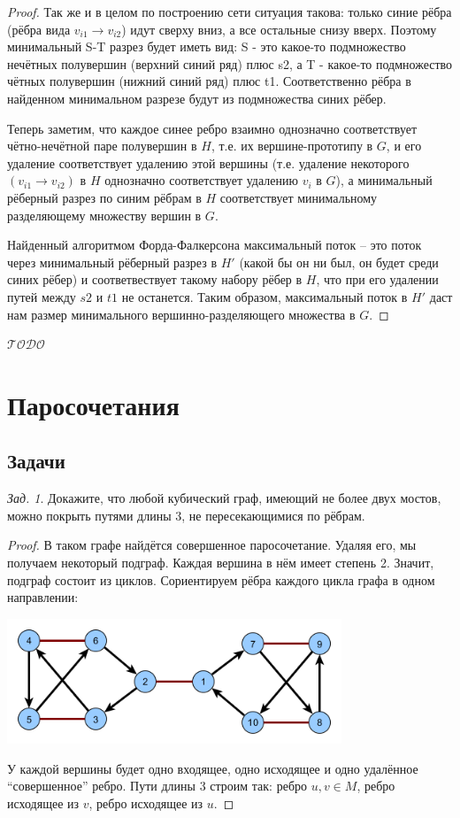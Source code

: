 \documentclass[a4paper,12pt]{article}
\numberwithin{figure}{section}
\theoremstyle{remark}
\newtheorem{problem}{Зад.}[section]
\def\iiTODO{\guillemotleft$\mathcal{TODO}$\guillemotright\textellipsis}
\begin{document}
\begin{proof}
	Так же и в целом по построению сети ситуация такова: только синие рёбра (рёбра вида $v_{i1} \rightarrow v_{i2}$) идут сверху вниз, а все остальные снизу вверх. Поэтому минимальный S-T разрез будет иметь вид: S - это какое-то подмножество нечётных полувершин (верхний синий ряд) плюс s2, а T - какое-то подмножество чётных полувершин (нижний синий ряд) плюс t1. Соответственно рёбра в найденном минимальном разрезе будут из подмножества синих рёбер.
	
	Теперь заметим, что каждое синее ребро взаимно однозначно соответствует чётно-нечётной паре полувершин в $H$, т.е. их вершине-прототипу в $G$, и его удаление соответствует удалению этой вершины (т.е. удаление некоторого $(v_{i1} \rightarrow v_{i2})$ в $H$ однозначно соответствует удалению $v_i$ в $G$), а минимальный рёберный разрез по синим рёбрам в $H$ соответствует минимальному разделяющему множеству вершин в $G$.
	
	Найденный алгоритмом Форда-Фалкерсона максимальный поток -- это поток через минимальный рёберный разрез в $H'$ (какой бы он ни был, он будет среди синих рёбер) и соответвествует такому набору рёбер в $H$, что при его удалении путей между $s2$ и $t1$ не останется. Таким образом, максимальный поток в $H'$ даст нам размер минимального вершинно-разделяющего множества в $G$.
\end{proof}

\iiTODO



\section{Паросочетания}

\subsection{Задачи}

\begin{problem}
	Докажите, что любой кубический граф, имеющий не более двух мостов, можно покрыть путями длины 3, не пересекающимися по рёбрам.
\end{problem}
\begin{proof}
	В таком графе найдётся совершенное паросочетание. Удаляя его, мы получаем некоторый подграф. Каждая вершина в нём имеет степень 2. Значит, подграф состоит из циклов. Сориентируем рёбра каждого цикла графа в одном направлении:
	\begin{center}
		\includegraphics[width=10cm]{cubic-graph-cover-paths-3.png}
	\end{center}
	У каждой вершины будет одно входящее, одно исходящее и одно удалённое ``совершенное'' ребро. Пути длины 3 строим так: ребро ${u,v} \in M$, ребро исходящее из $v$, ребро исходящее из $u$.
\end{proof}
\end{document}
